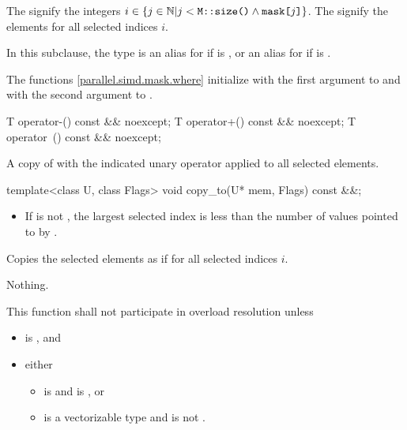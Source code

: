 \pnum
The  signify the integers $i \in \{j \in \mathbb{N} | j < \texttt{M::size()} \wedge \texttt{mask[}j\texttt{]}\}$. The  signify the elements  for all selected indices $i$.

\pnum
In this subclause, the type  is an alias for  if  is , or an alias for  if  is .

\pnum
\begin{note}
  The  functions \ref{parallel.simd.mask.where} initialize  with the first argument to  and  with the second argument to .
\end{note}

\begin{itemdecl}
T operator-() const && noexcept;
T operator+() const && noexcept;
T operator~() const && noexcept;
\end{itemdecl}

\begin{itemdescr}
  \pnum\returns
  A copy of  with the indicated unary operator applied to all selected elements.
\end{itemdescr}

\begin{itemdecl}
template<class U, class Flags> void copy_to(U* mem, Flags) const &&;
\end{itemdecl}

\begin{itemdescr}
  \pnum\requires
  \begin{itemize}
    \item If  is not , the largest selected index is less than the number of values pointed to by .
  \end{itemize}

  \pnum\effects
  Copies the selected elements as if  for all selected indices $i$.

  \pnum\throws Nothing.

  \pnum\remarks
  This function shall not participate in overload resolution unless
  \begin{itemize}
    \item {} is , and
    \item either
      \begin{itemize}
        \item {} is  and  is , or
        \item {} is a vectorizable type and  is not .
      \end{itemize}
  \end{itemize}
\end{itemdescr}

